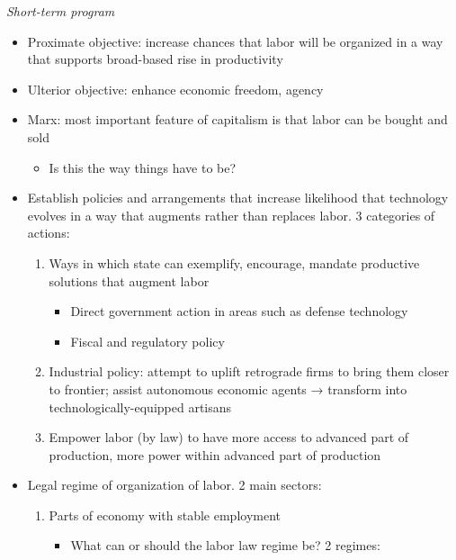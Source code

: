 \emph{Short-term program}

\begin{itemize}
\tightlist
\item
  Proximate objective: increase chances that labor will be organized in
  a way that supports broad-based rise in productivity
\item
  Ulterior objective: enhance economic freedom, agency
\item
  Marx: most important feature of capitalism is that labor can be bought
  and sold

  \begin{itemize}
  \tightlist
  \item
    Is this the way things have to be?
  \end{itemize}
\item
  Establish policies and arrangements that increase likelihood that
  technology evolves in a way that augments rather than replaces labor.
  3 categories of actions:

  \begin{enumerate}
  \def\labelenumi{\arabic{enumi}.}
  \tightlist
  \item
    Ways in which state can exemplify, encourage, mandate productive
    solutions that augment labor

    \begin{itemize}
    \tightlist
    \item
      Direct government action in areas such as defense technology
    \item
      Fiscal and regulatory policy
    \end{itemize}
  \item
    Industrial policy: attempt to uplift retrograde firms to bring them
    closer to frontier; assist autonomous economic agents → transform
    into technologically-equipped artisans
  \item
    Empower labor (by law) to have more access to advanced part of
    production, more power within advanced part of production
  \end{enumerate}
\item
  Legal regime of organization of labor. 2 main sectors:

  \begin{enumerate}
  \def\labelenumi{\arabic{enumi}.}
  \tightlist
  \item
    Parts of economy with stable employment

    \begin{itemize}
    \tightlist
    \item
      What can or should the labor law regime be? 2 regimes:


\end{itemize}
\end{enumerate}
\end{itemize}
